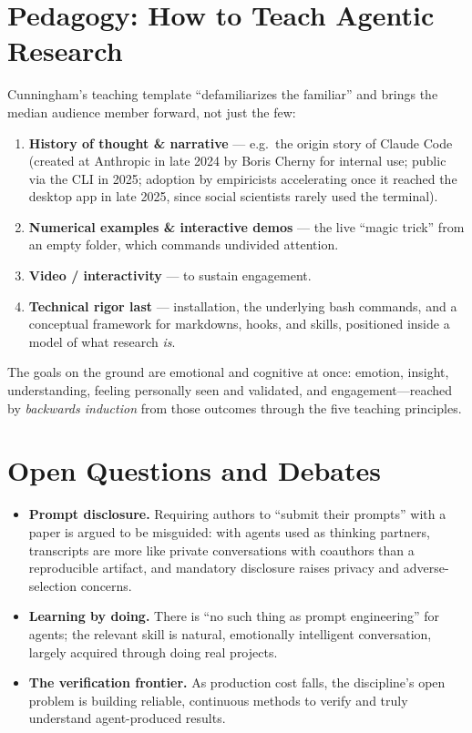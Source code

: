 \documentclass[11pt]{article}
\begin{document}
\section{Pedagogy: How to Teach Agentic Research}
Cunningham's teaching template ``defamiliarizes the familiar'' and brings the
median audience member forward, not just the few:
\begin{enumerate}[label=\arabic*.]
  \item \textbf{History of thought \& narrative} --- e.g.\ the origin story of Claude Code (created at Anthropic in late 2024 by Boris Cherny for internal use; public via the CLI in 2025; adoption by empiricists accelerating once it reached the desktop app in late 2025, since social scientists rarely used the terminal).
  \item \textbf{Numerical examples \& interactive demos} --- the live ``magic trick'' from an empty folder, which commands undivided attention.
  \item \textbf{Video / interactivity} --- to sustain engagement.
  \item \textbf{Technical rigor last} --- installation, the underlying bash commands, and a conceptual framework for markdowns, hooks, and skills, positioned inside a model of what research \emph{is}.
\end{enumerate}
The goals on the ground are emotional and cognitive at once: emotion, insight,
understanding, feeling personally seen and validated, and engagement---reached by
\emph{backwards induction} from those outcomes through the five teaching principles.

\section{Open Questions and Debates}
\begin{itemize}[leftmargin=1.5em]
  \item \textbf{Prompt disclosure.} Requiring authors to ``submit their prompts'' with a paper is argued to be misguided: with agents used as thinking partners, transcripts are more like private conversations with coauthors than a reproducible artifact, and mandatory disclosure raises privacy and adverse-selection concerns.
  \item \textbf{Learning by doing.} There is ``no such thing as prompt engineering'' for agents; the relevant skill is natural, emotionally intelligent conversation, largely acquired through doing real projects.
  \item \textbf{The verification frontier.} As production cost falls, the discipline's open problem is building reliable, continuous methods to verify and truly understand agent-produced results.
\end{itemize}
\end{document}
